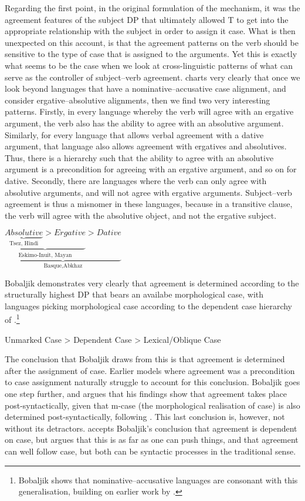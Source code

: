 \documentclass[output=paper
,modfonts
,nonflat]{langsci/langscibook}
\begin{document}
Regarding the first point, in the original formulation of the {\agr} mechanism, it was the agreement features of the subject DP that ultimately allowed T to get into the appropriate relationship with the subject in order to assign it case.
What is then unexpected on this account, is that the agreement patterns on the verb should be sensitive to the type of case that is assigned to the arguments.
Yet this is exactly what seems to be the case when we look at cross-linguistic patterns of what can serve as the controller of subject--verb agreement.
\citet{Bobaljik2008} charts very clearly that once we look beyond languages that have a nominative--accusative case alignment, and consider ergative--absolutive alignments, then we find two very interesting patterns.
Firstly, in every language whereby the verb will agree with an ergative argument, the verb also has the ability to agree with an absolutive argument.
Similarly, for every language that allows verbal agreement with a dative argument, that language also allows agreement with ergatives and absolutives.
Thus, there is a hierarchy such that the ability to agree with an absolutive argument is a precondition for agreeing with an ergative argument, and so on for dative.
Secondly, there are languages where the verb can only agree with absolutive arguments, and will not agree with ergative arguments.
Subject--verb agreement is thus a misnomer in these languages, because in a transitive clause, the verb will agree with the absolutive object, and not the ergative subject.

\begin{exe}
	\ex
	$\underbrace{\underbrace{\underbrace{{Absolutive}}_{\text{Tsez, Hindi}} > {Ergative}}_{\text{Eskimo-Inuit, Mayan}} > {Dative}}_{\text{Basque,Abkhaz}}$
\end{exe}
Bobaljik demonstrates very clearly that agreement is determined according to the structurally highest DP that bears an availabe morphological case, with languages picking morphological case according to the dependent case hierarchy of \citet{Marantz1991}.\footnote{Bobaljik shows that nominative--accusative languages are consonant with this generalisation, building on earlier work by \citet{Moravcsik1974}.}

\begin{exe}
	\ex
	Unmarked Case \textgreater {} Dependent Case \textgreater {} Lexical/Oblique Case
\end{exe}
The conclusion that Bobaljik draws from this is that agreement is determined after the assignment of case.
Earlier models where agreement was a precondition to case assignment naturally struggle to account for this conclusion.
Bobaljik goes one step further, and argues that his findings show that agreement takes place post-syntactically, given that m-case (the morphological realisation of case) is also determined post-syntactically, following \citet{Marantz1991}.
This last conclusion is, however, not without its detractors.
\citet{preminger2011,preminger2015} accepts Bobaljik's conclusion that agreement is dependent on case, but argues that this is as far as one can push things, and that agreement can well follow case, but both can be syntactic processes in the traditional sense.
\end{document}

